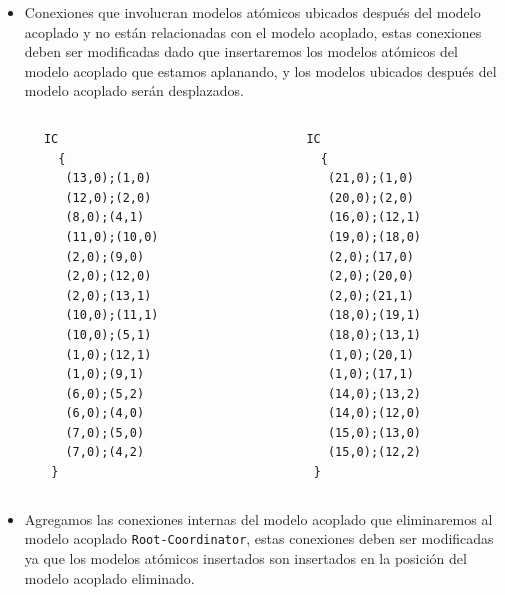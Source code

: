 \documentclass{beamer}
\begin{document}
\begin{frame}
\begin{itemize}
        \item Conexiones que involucran modelos atómicos ubicados después del modelo acoplado y no están relacionadas con el modelo acoplado, 
        estas conexiones deben ser modificadas dado que insertaremos los modelos atómicos del modelo acoplado que estamos aplanando, y los modelos 
        ubicados después del modelo acoplado serán desplazados.
\end{itemize}
\end{frame}

\begin{frame}[fragile]
\begin{columns}[T] %
\begin{column}{.48\textwidth}
\begin{verbatim}
      IC
        {
         (13,0);(1,0)
         (12,0);(2,0)
         (8,0);(4,1)
         (11,0);(10,0)
         (2,0);(9,0)
         (2,0);(12,0)
         (2,0);(13,1)
         (10,0);(11,1)
         (10,0);(5,1)
         (1,0);(12,1)
         (1,0);(9,1)
         (6,0);(5,2)
         (6,0);(4,0)
         (7,0);(5,0)
         (7,0);(4,2)
       }
\end{verbatim}
\end{column}%
\hfill%
\begin{column}{.48\textwidth}
\begin{verbatim}
      IC
        {
         (21,0);(1,0)
         (20,0);(2,0)
         (16,0);(12,1)
         (19,0);(18,0)
         (2,0);(17,0)
         (2,0);(20,0)
         (2,0);(21,1)
         (18,0);(19,1)
         (18,0);(13,1)
         (1,0);(20,1)
         (1,0);(17,1)
         (14,0);(13,2)
         (14,0);(12,0)
         (15,0);(13,0)
         (15,0);(12,2)
       }
\end{verbatim}
\end{column}%
\end{columns}
\end{frame}

\begin{frame}[fragile]
\begin{itemize}
        \item Agregamos las conexiones internas del modelo acoplado que eliminaremos al modelo acoplado \texttt{Root-Coordinator}, estas conexiones deben ser 
        modificadas ya que los modelos atómicos insertados son insertados en la posición del modelo acoplado eliminado.
\end{itemize}
\end{frame}
\end{document}
